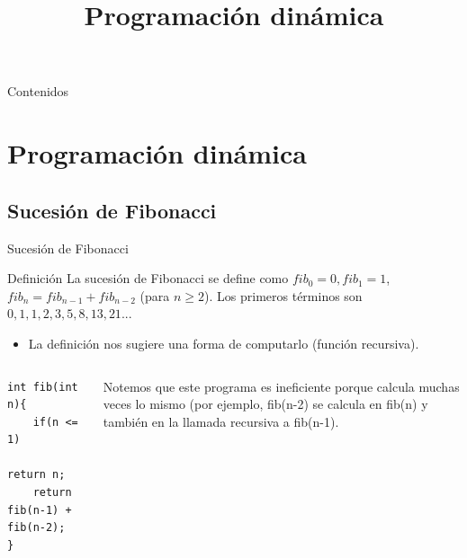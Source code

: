 \documentclass{beamer}
\title[Programaci\'on din\'amica]{Programaci\'on din\'amica}
\begin{document}
\begin{frame}
  \titlepage
\end{frame}

\begin{frame}{Contenidos}
  \tableofcontents
\end{frame}

\section{Programaci\'on din\'amica}

\subsection{Sucesi\'on de Fibonacci}

\begin{frame}[fragile]{Sucesi\'on de Fibonacci}
\begin{block}{Definici\'on}
La sucesi\'on de Fibonacci se define como $fib_0 = 0, fib_1 = 1$, $fib_n = fib_{n-1} + fib_{n-2}$ (para $n \ge 2$). Los primeros t\'erminos son $0,1,1,2,3,5,8,13,21 ...$
\end{block}
\begin{itemize}
\item
La definici\'on nos sugiere una forma de computarlo (funci\'on recursiva).
\end{itemize}
\begin{columns}
\begin{column}{0.5\textwidth}
\begin{lstlisting}
int fib(int n){
	if(n <= 1)
		return n;
	return fib(n-1) + fib(n-2);
}
\end{lstlisting}
\end{column}
\begin{column}{0.5\textwidth}
\pause
Notemos que este programa es ineficiente porque calcula muchas veces lo mismo (por ejemplo, fib(n-2) se calcula en fib(n) y tambi\'en en la llamada recursiva a fib(n-1).
\end{column}
\end{columns}
\end{frame}
\end{document}
